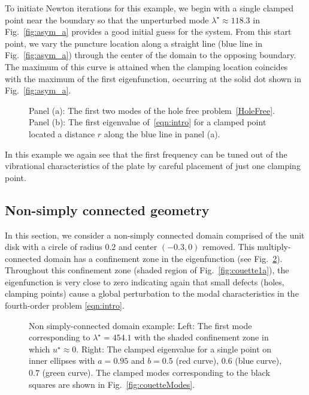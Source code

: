 \documentclass[times]{article}
\begin{document}
To initiate Newton iterations for this example, we begin with a single
clamped point near the boundary so that the unperturbed mode
$\lambda^{\star}\approx 118.3$ in Fig.~\ref{fig:asym_a} provides a good
initial guess for the system. From this start point, we vary the
puncture location along a straight line (blue line in
Fig.~\ref{fig:asym_a}) through the center of the domain to the opposing
boundary. The maximum of this curve is attained when the clamping
location coincides with the maximum of the first eigenfunction,
occurring at the solid dot shown in Fig.~\ref{fig:asym_a}.
\begin{figure}[htbp]
\centering
{}\qquad
{}
\parbox{0.75\textwidth}{\caption{Panel (a): The first two modes of the hole free problem~\eqref{HoleFree}. Panel (b): The first eigenvalue of~\eqref{eqn:intro} for a clamped point located a distance $r$ along the blue line in panel (a). \label{fig:asym} }}
\end{figure}
%
In this example we again see that the first frequency can be tuned out of the vibrational characteristics of the plate by careful placement of just one clamping point.
%
\subsection{Non-simply connected geometry}
In this section, we consider a non-simply connected domain comprised of
the unit disk with a circle of radius $0.2$ and center $(-0.3,0)$
removed.  This multiply-connected domain has a confinement zone in the
eigenfunction (see Fig.~\ref{fig:couette1}). Throughout this confinement
zone (shaded region of Fig.~\ref{fig:couette1a}), the eigenfunction is
very close to zero indicating again that small defects (holes, clamping
points) cause a global perturbation to the modal characteristics in the
fourth-order problem \eqref{eqn:intro}.
\begin{figure}[htbp]
\centering
{}\hspace{1in}
\parbox{0.75\textwidth}{\caption{Non simply-connected domain example: Left: The
first mode corresponding to $\lambda^{\star} = 454.1$ with the shaded
confinement zone in which
$u^{\star} \approx 0$. Right: The clamped eigenvalue for a single point
on inner ellipses with $a = 0.95$ and $b = 0.5$ (red curve), $0.6$ (blue curve), $0.7$ (green curve). The clamped
modes corresponding to the black squares are shown in Fig.~\ref{fig:couetteModes}.
\label{fig:couette1}}}
\end{figure}
\end{document}
